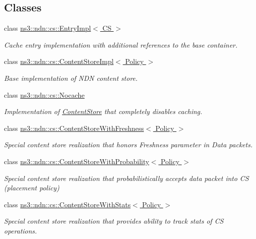 \subsection*{Classes}
\begin{DoxyCompactItemize}
\item 
class \hyperlink{classns3_1_1ndn_1_1cs_1_1EntryImpl}{ns3\+::ndn\+::cs\+::\+Entry\+Impl$<$ C\+S $>$}
\begin{DoxyCompactList}\small\item\em Cache entry implementation with additional references to the base container. \end{DoxyCompactList}\item 
class \hyperlink{classns3_1_1ndn_1_1cs_1_1ContentStoreImpl}{ns3\+::ndn\+::cs\+::\+Content\+Store\+Impl$<$ Policy $>$}
\begin{DoxyCompactList}\small\item\em Base implementation of N\+DN content store. \end{DoxyCompactList}\item 
class \hyperlink{classns3_1_1ndn_1_1cs_1_1Nocache}{ns3\+::ndn\+::cs\+::\+Nocache}
\begin{DoxyCompactList}\small\item\em Implementation of \hyperlink{classns3_1_1ndn_1_1ContentStore}{Content\+Store} that completely disables caching. \end{DoxyCompactList}\item 
class \hyperlink{classns3_1_1ndn_1_1cs_1_1ContentStoreWithFreshness}{ns3\+::ndn\+::cs\+::\+Content\+Store\+With\+Freshness$<$ Policy $>$}
\begin{DoxyCompactList}\small\item\em Special content store realization that honors Freshness parameter in Data packets. \end{DoxyCompactList}\item 
class \hyperlink{classns3_1_1ndn_1_1cs_1_1ContentStoreWithProbability}{ns3\+::ndn\+::cs\+::\+Content\+Store\+With\+Probability$<$ Policy $>$}
\begin{DoxyCompactList}\small\item\em Special content store realization that probabilistically accepts data packet into CS (placement policy) \end{DoxyCompactList}\item 
class \hyperlink{classns3_1_1ndn_1_1cs_1_1ContentStoreWithStats}{ns3\+::ndn\+::cs\+::\+Content\+Store\+With\+Stats$<$ Policy $>$}
\begin{DoxyCompactList}\small\item\em Special content store realization that provides ability to track stats of CS operations. \end{DoxyCompactList}\item 

\end{DoxyCompactItemize}

